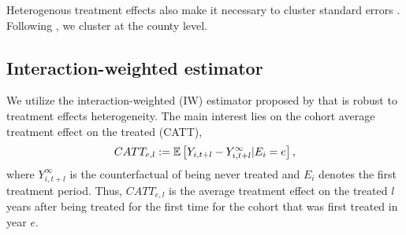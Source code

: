 Heterogenous treatment effects also make it necessary to cluster standard errors \citep[see][]{Abadie_2017}. Following \cite{Sun_2021}, we cluster at the county level.


\subsection{Interaction-weighted estimator}

We utilize the interaction-weighted (IW) estimator proposed by \cite{Sun_2021} that is robust to treatment effects heterogeneity. The main interest lies on the cohort average treatment effect on the treated (CATT),
\begin{align*}
	CATT_{e, l} := \mathbb{E} \left[ Y_{i, t+l} - Y_{i, t+l}^{\infty} | E_i = e \right],
\end{align*}
where $Y_{i, t+l}^{\infty}$ is the counterfactual of being never treated and $E_i$ denotes the first treatment period. Thus, $CATT_{e, l}$ is the average treatment effect on the treated $l$ years after being treated for the first time for the cohort that was first treated in year $e$.

